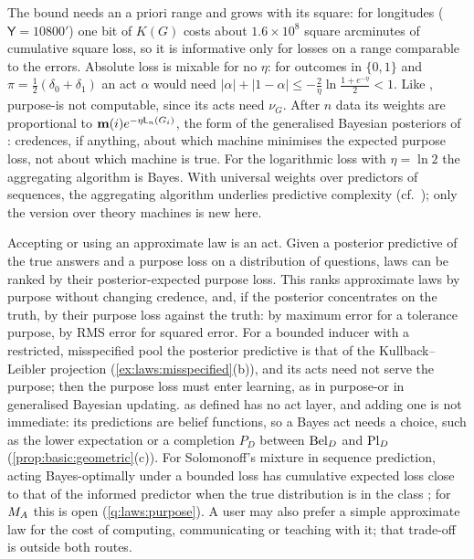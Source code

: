 The bound needs an a priori range and grows with its square: for longitudes ($\mathsf Y=10800'$) one bit of $K(G)$ costs about $1.6\times10^8$ square arcminutes of cumulative square loss, so it is informative only for losses on a range comparable to the errors. Absolute loss is mixable for no $\eta$: for outcomes in $\{0,1\}$ and $\pi=\frac12(\delta_0+\delta_1)$ an act $\alpha$ would need $\lvert\alpha\rvert+\lvert1-\alpha\rvert\le-\frac2\eta\ln\frac{1+e^{-\eta}}2<1$. Like \SAIabbr, purpose-\SAIabbr is not computable, since its acts need $\nu_G$. After $n$ data its weights are proportional to $\mathbf{m}(i)e^{-\eta\mathsf L_n(G_i)}$, the form of the generalised Bayesian posteriors of \citet{bissiri2016general}: credences, if anything, about which machine minimises the expected purpose loss, not about which machine is true. For the logarithmic loss with $\eta=\ln2$ the aggregating algorithm is Bayes. With universal weights over predictors of sequences, the aggregating algorithm underlies predictive complexity (cf.\ \citealp{vovk1998universal}); only the version over theory machines is new here.

\begin{remark}\label{rem:laws:decision}
Accepting or using an approximate law is an act. Given a posterior predictive of the true answers and a purpose loss on a distribution of questions, laws can be ranked by their posterior-expected purpose loss. This ranks approximate laws by purpose without changing credence, and, if the posterior concentrates on the truth, by their purpose loss against the truth: by maximum error for a tolerance purpose, by RMS error for squared error. For a bounded inducer with a restricted, misspecified pool the posterior predictive is that of the Kullback--Leibler projection (\cref{ex:laws:misspecified}(b)), and its acts need not serve the purpose; then the purpose loss must enter learning, as in purpose-\SAIabbr or in generalised Bayesian updating. \SAIabbr as defined has no act layer, and adding one is not immediate: its predictions are belief functions, so a Bayes act needs a choice, such as the lower expectation or a completion $P_D$ between $\mathrm{Bel}_D$ and $\mathrm{Pl}_D$ (\cref{prop:basic:geometric}(c)). For Solomonoff's mixture in sequence prediction, acting Bayes-optimally under a bounded loss has cumulative expected loss close to that of the informed predictor when the true distribution is in the class \citep{hutter2003optimality}; for $M_{A}$ this is open (\cref{q:laws:purpose}). A user may also prefer a simple approximate law for the cost of computing, communicating or teaching with it; that trade-off is outside both routes.
\end{remark}

